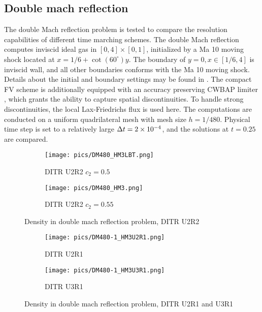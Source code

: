 \subsection{Double mach reflection}

The double Mach reflection problem \cite{woodward1984dmr} is tested to
compare the resolution capabilities
of different time marching schemes.
The double Mach reflection computes
inviscid ideal gas in $[0,4]\times[0,1]$,
initialized by a Ma 10 moving shock located
at $x = 1/6 + \cot(60^\circ) y$.
The boundary of $y=0, x\in[1/6,4]$ is
inviscid wall, and all other boundaries
conforms with the Ma 10 moving shock.
Details about the initial and boundary settings may be found in \cite{woodward1984dmr}.
The compact FV scheme is additionally equipped with
an accuracy preserving CWBAP limiter \cite{wu2023cwbap},
which grants the ability to capture spatial  discontinuities.
To handle strong discontinuities, the local Lax-Friedrichs flux
is used here.
The computations are conducted on a uniform quadrilateral mesh with
mesh size $h=1/480$.
Physical time step is set to a relatively large $\mathrm\Delta t= 2\times10^{-4}$,
and the solutions at $t=0.25$ are compared.

\begin{figure}[htbp]
    \centering
    \begin{subfigure}{0.5\textwidth}
        \texttt{[image: pics/DM480\_HM3LBT.png]}
        \caption[]{DITR U2R2 $c_2=0.5$}
        \label{sfig:DM480_HM3LBT}
    \end{subfigure}\hfill
    \begin{subfigure}{0.5\textwidth}
        \texttt{[image: pics/DM480\_HM3.png]}
        \caption[]{DITR U2R2 $c_2=0.55$}
        \label{sfig:DM480_HM3}
    \end{subfigure}
    \caption{Density in double mach reflection problem, DITR U2R2}
    \label{fig:DM480-1}
\end{figure}

\begin{figure}[htbp]
    \centering
    \begin{subfigure}{0.5\textwidth}
        \texttt{[image: pics/DM480-1\_HM3U2R1.png]}
        \caption[]{DITR U2R1}
        \label{sfig:DM480_HM3U2R1}
    \end{subfigure}\hfill
    \begin{subfigure}{0.5\textwidth}
        \texttt{[image: pics/DM480-1\_HM3U3R1.png]}
        \caption[]{DITR U3R1}
        \label{sfig:DM480_HM3U3R1}
    \end{subfigure}
    \caption{Density in double mach reflection problem, DITR U2R1 and U3R1}
    \label{fig:DM480-2}
\end{figure}

